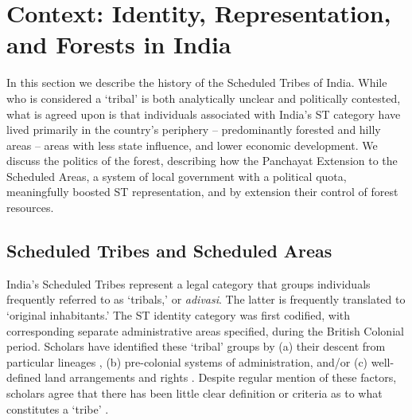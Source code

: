 \documentclass[12pt,reqno]{article}
\begin{document}



%


\section{Context: Identity, Representation, and Forests in India} \label{sec:context}


In this section we describe the history of the Scheduled Tribes of India. While who is considered a `tribal' is both analytically unclear and politically contested, what is agreed upon is that individuals associated with India's ST category have lived primarily in the country's periphery -- predominantly forested and hilly areas -- areas with less state influence, and lower economic development. We discuss the politics of the forest, describing how the Panchayat Extension to the Scheduled Areas, a system of local government with a political quota, meaningfully boosted ST representation, and by extension their control of forest resources. 

\subsection{Scheduled Tribes and Scheduled Areas}

India's Scheduled Tribes represent a legal category that groups individuals frequently referred to as  `tribals,' or \emph{adivasi}. The latter is frequently translated to `original inhabitants.' The ST identity category was first codified, with corresponding separate administrative areas specified, during the British Colonial period. Scholars have identified these  `tribal' groups by (a) their descent from particular lineages \parencite{Sundar2009b}, (b) pre-colonial systems of administration, and/or (c) well-defined land arrangements and rights \parencite{DasGupta2011b}. Despite regular mention of these factors, scholars agree that there has been little clear definition or criteria as to what constitutes a `tribe' \parencite{Beteille1974, skaria1997shades, Corbridge, Corbridge2002, Galanter}. 
\end{document}
